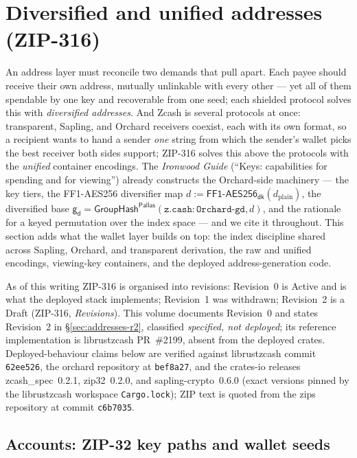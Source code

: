 \documentclass[11pt,a4paper]{article}
\theoremstyle{definition}
\newcommand{\Pallas}{\ensuremath{\mathsf{Pallas}}}
\newcommand{\GroupHash}{\ensuremath{\mathsf{GroupHash}}}
\newcommand{\dk}{\ensuremath{\mathsf{dk}}}
\newcommand{\gd}{\ensuremath{\mathsf{g_d}}}
\begin{document}
\section{Diversified and unified addresses (ZIP-316)}\label{sec:addresses}

An address layer must reconcile two demands that pull apart. Each payee
should receive their own address, mutually unlinkable with every other ---
yet all of them spendable by one key and recoverable from one seed; each
shielded protocol solves this with \emph{diversified addresses}. And Zcash
is several protocols at once: transparent, Sapling, and Orchard receivers
coexist, each with its own format, so a recipient wants to hand a sender
\emph{one} string from which the sender's wallet picks the best receiver
both sides support; ZIP-316 solves this above the protocols with the
\emph{unified} container encodings. The \emph{Ironwood Guide} (``Keys:
capabilities for spending and for viewing'') already constructs the
Orchard-side machinery --- the key tiers, the FF1-AES256 diversifier map
$d := \mathsf{FF1\text{-}AES256}_{\dk}(d_{\mathrm{plain}})$, the
diversified base
$\gd = \GroupHash^{\Pallas}(\mathtt{z.cash:Orchard\text{-}gd}, d)$, and the
rationale for a keyed permutation over the index space --- and we cite it
throughout. This section adds what the wallet layer builds on top: the
index discipline shared across Sapling, Orchard, and transparent
derivation, the raw and unified encodings, viewing-key containers, and the
deployed address-generation code.

As of this writing ZIP-316 is organised into revisions: Revision~0 is
Active and is what the deployed stack implements; Revision~1 was withdrawn;
Revision~2 is a Draft (ZIP-316, \emph{Revisions}). This volume documents
Revision~0 and states Revision~2 in \S\ref{sec:addresses-r2}, classified
\emph{specified, not deployed}; its reference implementation is
\textsf{librustzcash} PR~\#2199, absent from the deployed crates.
Deployed-behaviour claims below are verified against \textsf{librustzcash}
commit \texttt{62ee526}, the \textsf{orchard} repository at
\texttt{bef8a27}, and the crates-io releases \textsf{zcash\_spec}~0.2.1,
\textsf{zip32}~0.2.0, and \textsf{sapling-crypto}~0.6.0 (exact versions
pinned by the \textsf{librustzcash} workspace \texttt{Cargo.lock}); ZIP
text is
quoted from the \textsf{zips} repository at commit \texttt{c6b7035}.

\subsection{Accounts: ZIP-32 key paths and wallet seeds}\label{sec:addresses-accounts}
\end{document}
